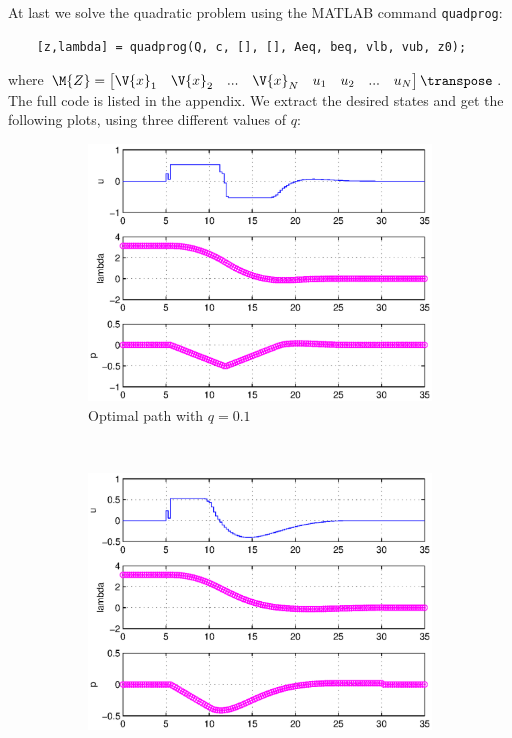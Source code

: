 At last we solve the quadratic problem using the MATLAB command \texttt{quadprog}:

\begin{lstlisting}
	[z,lambda] = quadprog(Q, c, [], [], Aeq, beq, vlb, vub, z0);
\end{lstlisting}
where $\M{Z} = \begin{bmatrix} \V{x}_1 & \V{x}_2 & ... & \V{x}_N & u_1 & u_2 & ... & u_N \end{bmatrix} \transpose$. The full code is listed in the appendix. We extract the desired states and get the following plots, using three different values of $q$:


\begin{figure}[H]
        \centering
        \begin{subfigure}[b]{0.5\textwidth}
                \includegraphics[width=\textwidth]{day2q0komma1}
                \caption{Optimal path with $q = 0.1$}
                \label{fig:estimatedDay201}
        \end{subfigure}%
        ~ 
        \begin{subfigure}[b]{0.5\textwidth}
                \includegraphics[width=\textwidth]{day2q1}

\end{subfigure}
\end{figure}
